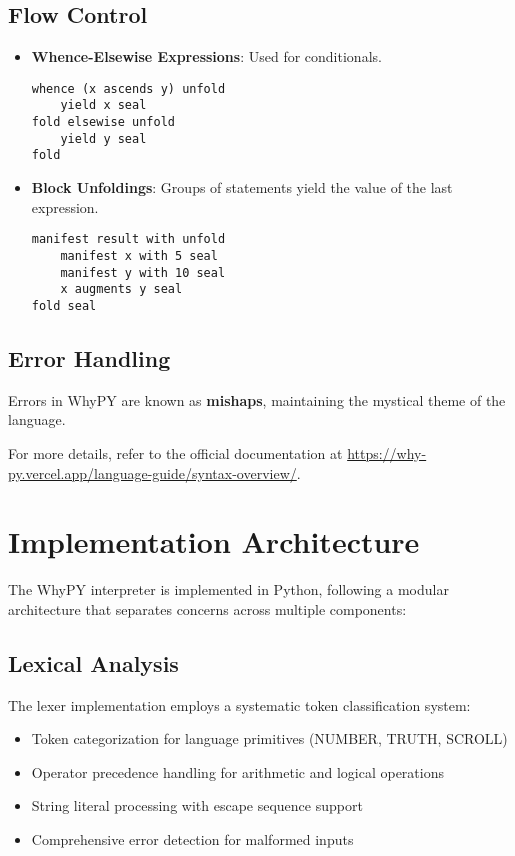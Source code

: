 \documentclass[conference]{IEEEtran}
\begin{document}
\subsection{Flow Control}
\begin{itemize}
    \item \textbf{Whence-Elsewise Expressions}: Used for conditionals.
    \begin{lstlisting}
whence (x ascends y) unfold
    yield x seal
fold elsewise unfold
    yield y seal
fold
    \end{lstlisting}
    \item \textbf{Block Unfoldings}: Groups of statements yield the value of the last expression.
    \begin{lstlisting}
manifest result with unfold
    manifest x with 5 seal
    manifest y with 10 seal
    x augments y seal
fold seal
    \end{lstlisting}
\end{itemize}

\subsection{Error Handling}
Errors in WhyPY are known as \textbf{mishaps}, maintaining the mystical theme of the language.

For more details, refer to the official documentation at \url{https://why-py.vercel.app/language-guide/syntax-overview/}.



\section{Implementation Architecture}
The WhyPY interpreter is implemented in Python, following a modular architecture that separates concerns across multiple components:

\subsection{Lexical Analysis}
The lexer implementation employs a systematic token classification system:
\begin{itemize}
    \item Token categorization for language primitives (NUMBER, TRUTH, SCROLL)
    \item Operator precedence handling for arithmetic and logical operations
    \item String literal processing with escape sequence support
    \item Comprehensive error detection for malformed inputs
\end{itemize}
\end{document}

